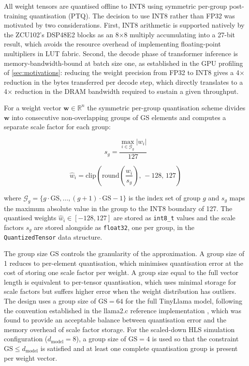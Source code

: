 All weight tensors are quantised offline to INT8 using symmetric per-group
post-training quantisation (PTQ). The decision to use INT8 rather than FP32
was motivated by two considerations. First, INT8 arithmetic is
supported natively by the ZCU102's DSP48E2 blocks as an 8$\times$8 multiply
accumulating into a 27-bit result, which avoids the resource overhead of
implementing floating-point multipliers in LUT fabric. Second, the decode
phase of transformer inference is memory-bandwidth-bound at batch size one,
as established in the GPU profiling of \cref{sec:motivations}: reducing the
weight precision from FP32 to INT8 gives a 4$\times$ reduction in the bytes
transferred per decode step, which directly translates to a 4$\times$
reduction in the DRAM bandwidth required to sustain a given throughput.

For a weight vector $\mathbf{w} \in \mathbb{R}^n$ the symmetric per-group
quantisation scheme divides $\mathbf{w}$ into consecutive non-overlapping
groups of $\text{GS}$ elements and computes a separate scale factor for each
group:

\begin{equation}
  s_g = \frac{\max_{i \in \mathcal{G}_g} |w_i|}{127}
  \label{eq:scale_factor}
\end{equation}

\begin{equation}
  \hat{w}_i = \text{clip}\!\left(\text{round}\!\left(\frac{w_i}{s_g}\right),\,-128,\,127\right)
  \label{eq:quantise}
\end{equation}

\noindent where $\mathcal{G}_g = \{g \cdot \text{GS}, \ldots, (g+1) \cdot
\text{GS} - 1\}$ is the index set of group $g$ and $s_g$ maps the maximum
absolute value in the group to the INT8 boundary of 127. The quantised
weights $\hat{w}_i \in [-128, 127]$ are stored as \texttt{int8\_t} values
and the scale factors $s_g$ are stored alongside as \texttt{float32}, one
per group, in the \texttt{QuantizedTensor} data structure.

The group size $\text{GS}$ controls the granularity of the approximation.
A group size of 1 reduces to per-element quantisation, which minimises
quantisation error at the cost of storing one scale factor per weight. A
group size equal to the full vector length is equivalent to per-tensor
quantisation, which uses minimal storage for scale factors but suffers
higher error when the weight distribution has outliers. The design uses a
group size of $\text{GS} = 64$ for the full TinyLlama model, following the
convention established in the llama2.c reference implementation
\cite{PLACEHOLDER}, which was found to provide an acceptable balance between
quantisation error and the memory overhead of scale factor storage. For the
scaled-down HLS simulation configuration ($d_{\text{model}} = 8$), a group
size of $\text{GS} = 4$ is used so that the constraint $\text{GS} \leq
d_{\text{model}}$ is satisfied and at least one complete quantisation group
is present per weight vector.


